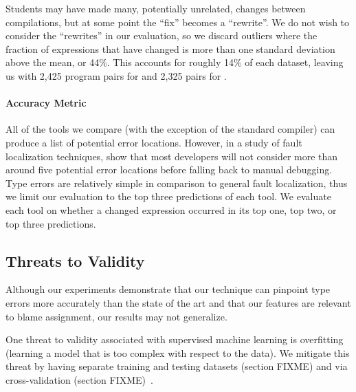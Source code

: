 Students may have made many, potentially unrelated, changes between
compilations, but at some point the ``fix'' becomes a ``rewrite''.
%
We do not wish to consider the ``rewrites'' in our evaluation, so we
discard outliers where the fraction of expressions that have changed is
more than one standard deviation above the mean, or 44\%.
%
This accounts for roughly 14\% of each dataset, leaving us with
2,425 program pairs for \SPRING and 2,325 pairs for \FALL.



\paragraph{Accuracy Metric}
All of the tools we compare (with the exception of the standard \ocaml
compiler) can produce a list of potential error locations. 
%
However, in a study of fault localization techniques,
\citet{Kochhar2016-oc} show that most developers will not consider more
than around five potential error locations before falling back to manual
debugging.
%
Type errors are relatively simple in comparison to general fault
localization, thus we limit our evaluation to the top three predictions
of each tool.
%
We evaluate each tool on whether a changed expression occurred in its
top one, top two, or top three predictions.





\subsection{Threats to Validity} 

Although our experiments demonstrate that our technique can pinpoint type
errors more accurately than the state of the art and that our features are
relevant to blame assignment, our results may not generalize. 

One threat to validity associated with supervised machine learning is
overfitting (\ie learning a model that is too complex with respect to the
data). We mitigate this threat by having separate training and testing
datasets (section FIXME) and via cross-validation (section
FIXME)~\cite{FIXME}. 

